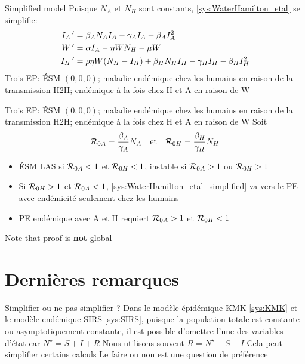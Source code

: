 \documentclass[aspectratio=169]{beamer}\usepackage[]{graphicx}\usepackage[]{xcolor}
\begin{document}
\begin{frame}{Simplified model}
  Puisque $N_A$ et $N_H$ sont constants, \eqref{sys:WaterHamilton_etal} se simplifie:
  \begin{subequations}
    \label{sys:WaterHamilton_etal_simplified}
    \begin{align}
      I_A\,' &= \beta_AN_AI_A-\gamma_AI_A-\beta_AI_A^2 \\
      W\,' &= \alpha I_A-\eta WN_H-\mu W \\
      I_H\,' &= \rho\eta W(N_H-I_H)+\beta_HN_HI_H-\gamma_HI_H-\beta_HI_H^2 
    \end{align}
  \end{subequations}
  \vfill
  Trois EP: ÉSM $(0,0,0)$; maladie endémique chez les humains en raison de la transmission H2H; endémique à la fois chez H et A en raison de W
\end{frame}


\begin{frame}
  Trois EP: ÉSM $(0,0,0)$; maladie endémique chez les humains en raison de la transmission H2H; endémique à la fois chez H et A en raison de W
  \vfill
  Soit
  \begin{equation}
    \mathcal{R}_{0A} = \frac{\beta_A}{\gamma_A}N_A\quad\text{et}\quad
    \mathcal{R}_{0H} = \frac{\beta_H}{\gamma_H}N_H
  \end{equation}
  \vfill
  \begin{itemize}
    \item ÉSM LAS si $\mathcal{R}_{0A}<1$ et $\mathcal{R}_{0H}<1$, instable si $\mathcal{R}_{0A}>1$ ou $\mathcal{R}_{0H}>1$
    \item Si $\mathcal{R}_{0H}>1$ et $\mathcal{R}_{0A}<1$, \eqref{sys:WaterHamilton_etal_simplified} va vers le PE avec endémicité seulement chez les humains
    \item PE endémique avec A et H requiert $\mathcal{R}_{0A}>1$ et $\mathcal{R}_{0H}<1$
  \end{itemize}
  Note that proof is \textbf{not} global
\end{frame}

\section{Dernières remarques}

\begin{frame}{Simplifier ou ne pas simplifier ?}
\bbullet Dans le modèle épidémique KMK \eqref{sys:KMK} et le modèle endémique SIRS \eqref{sys:SIRS}, puisque la population totale est constante ou asymptotiquement constante, il est possible d'omettre l'une des variables d'état car $N^\star=S+I+R$
\vfill
\bbullet Nous utilisons souvent $R=N^\star-S-I$
\vfill
\bbullet Cela peut simplifier certains calculs
\vfill
\bbullet Le faire ou non est une question de préférence
\end{frame}
\end{document}
